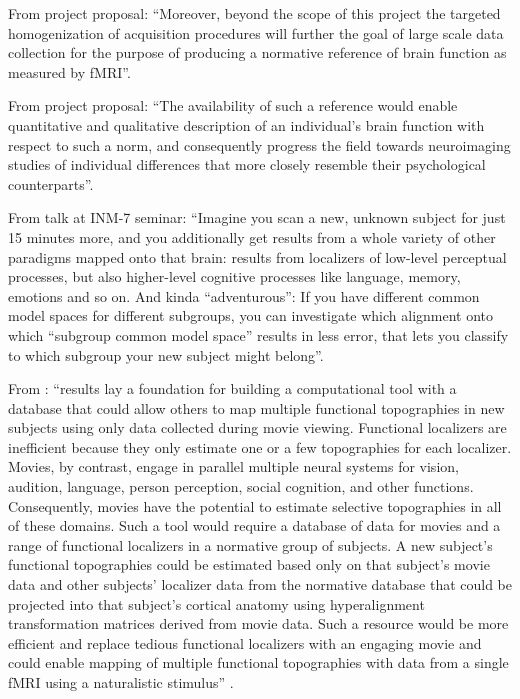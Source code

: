 %
From project proposal: ``Moreover, beyond the scope of this project the targeted
homogenization of acquisition procedures will further the goal of large scale
data collection for the purpose of producing a normative reference of brain
function as measured by fMRI''.

%
From project proposal: ``The availability of such a reference would enable
quantitative and qualitative description of an individual's brain function with
respect to such a norm, and consequently progress the field towards neuroimaging
studies of individual differences that more closely resemble their psychological
counterparts''.

%
From talk at INM-7 seminar: ``Imagine you scan a new, unknown subject for just
15 minutes more, and you additionally get results from a whole variety of other
paradigms mapped onto that brain: results from localizers of low-level
perceptual processes, but also higher-level cognitive processes like language,
memory, emotions and so on. And kinda ``adventurous'': If you have different
common model spaces for different subgroups, you can investigate which alignment
onto which ``subgroup common model space'' results in less error, that lets you
classify to which subgroup your new subject might belong''.

%
From \citep{jiahui2020predicting}: ``results lay a foundation for building a
computational tool with a database that could allow others to map multiple
functional topographies in new subjects using only data collected during movie
viewing. Functional localizers are inefficient because they only estimate one or
a few topographies for each localizer. Movies, by contrast, engage in parallel
multiple neural systems for vision, audition, language, person perception,
social cognition, and other functions. Consequently, movies have the potential
to estimate selective topographies in all of these domains. Such a tool would
require a database of data for movies and a range of functional localizers in a
normative group of subjects. A new subject's functional topographies could be
estimated based only on that subject's movie data and other subjects’ localizer
data from the normative database that could be projected into that subject’s
cortical anatomy using hyperalignment transformation matrices derived from movie
data. Such a resource would be more efficient and replace tedious functional
localizers with an engaging movie and could enable mapping of multiple
functional topographies with data from a single fMRI using a naturalistic
stimulus'' \citep{jiahui2020predicting}.

